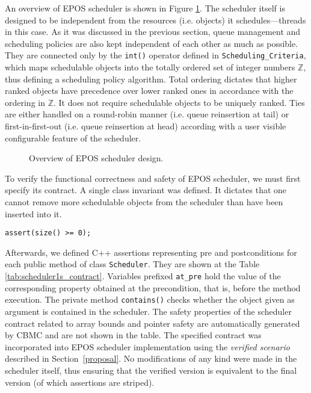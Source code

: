 \documentclass{sig-alternate}
\newcommand{\fig}[4][ht]{
  \begin{figure}[#1] {\centering\scalebox{#2}{\texttt{[image: fig/\#3]}}\par}
    \caption{#4\label{fig:#3}}
  \end{figure}
}
\begin{document}
An overview of EPOS scheduler is shown in Figure
\ref{fig:epos_scheduler}.  The scheduler itself is designed to be
independent from the resources (i.e. objects) it schedules---threads in
this case. As it was discussed in the previous section, queue management
and scheduling policies are also kept independent of each other as much
as possible. They are connected only by the \texttt{int()} operator
defined in \texttt{Scheduling\_Criteria}, which maps schedulable objects
into the totally ordered set of integer numbers $\mathbb{Z}$, thus
defining a scheduling policy algorithm. Total ordering dictates that
higher ranked objects have precedence over lower ranked ones in
accordance with the ordering in $\mathbb{Z}$. It does not require
schedulable objects to be uniquely ranked. Ties are either handled on a
round-robin manner (i.e. queue reinsertion at tail) or
first-in-first-out (i.e. queue reinsertion at head) according with a
user visible configurable feature of the scheduler.

\fig{.4}{epos_scheduler}{Overview of EPOS scheduler design.}

To verify the functional correctness and safety of EPOS scheduler, we
must first specify its contract. A single class invariant was defined.
It dictates that one cannot remove more schedulable objects from the
scheduler than have been inserted into it.
\begin{verbatim}
assert(size() >= 0);
\end{verbatim}
Afterwards, we defined C++ assertions representing pre and
postconditions for each public method of class \texttt{Scheduler}. They
are shown at the Table \ref{tab:scheduler1s_contract}. Variables
prefixed \texttt{at\_pre} hold the value of the corresponding property
obtained at the precondition, that is, before the method execution.  The
private method \texttt{contains()} checks whether the object given as
argument is contained in the scheduler.  The safety properties of the
scheduler contract related to array bounds and pointer safety are
automatically generated by CBMC and are not shown in the table. The
specified contract was incorporated into EPOS scheduler implementation
using the \emph{verified scenario} described in Section~\ref{proposal}.
No modifications of any kind were made in the scheduler itself, thus
ensuring that the verified version is equivalent to the final version
(of which assertions are striped).
\end{document}
